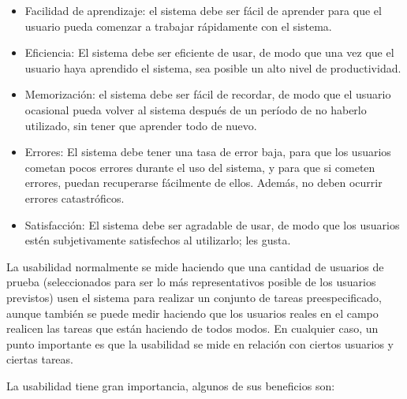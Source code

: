 \begin{itemize}
\item Facilidad de aprendizaje: el sistema debe ser fácil de aprender para que el usuario pueda comenzar a trabajar rápidamente con el sistema.
\item Eficiencia: El sistema debe ser eficiente de usar, de modo que una vez que el usuario haya aprendido el sistema, sea posible un alto nivel de productividad.
\item Memorización: el sistema debe ser fácil de recordar, de modo que el usuario ocasional pueda volver al sistema después de un período de no haberlo utilizado, sin tener que aprender todo de nuevo.
\item Errores: El sistema debe tener una tasa de error baja, para que los usuarios cometan pocos errores durante el uso del sistema, y para que si cometen errores, puedan recuperarse fácilmente de ellos. Además, no deben ocurrir errores catastróficos.
\item Satisfacción: El sistema debe ser agradable de usar, de modo que los usuarios estén subjetivamente satisfechos al utilizarlo; les gusta.
\end{itemize}

La usabilidad normalmente se mide haciendo que una cantidad de usuarios de prueba (seleccionados para ser lo más representativos posible de los usuarios previstos) usen el sistema para realizar un conjunto de tareas preespecificado, aunque también se puede medir haciendo que los usuarios reales en el campo realicen las tareas que están haciendo de todos modos. En cualquier caso, un punto importante es que la usabilidad se mide en relación con ciertos usuarios y ciertas tareas.

La usabilidad tiene gran importancia, algunos de sus beneficios son:

